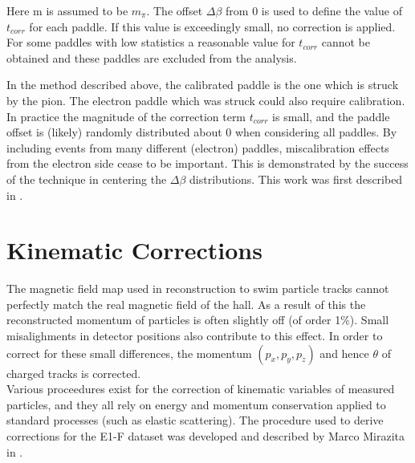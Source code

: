 Here m is assumed to be $m_{\pi}$.  The offset $\Delta \beta$ from 0 is used to define the value of $t_{corr}$ for each paddle.  If this value is exceedingly small, no correction is applied.  For some paddles with low statistics a reasonable value for $t_{corr}$ cannot be obtained and these paddles are excluded from the analysis.  \\


In the method described above, the calibrated paddle is the one which is struck by the pion.  The electron paddle which was struck could also require calibration.  In practice the magnitude of the correction term $t_{corr}$ is small, and the paddle offset is (likely) randomly distributed about 0 when considering all paddles.  By including events from many different (electron) paddles, miscalibration effects from the electron side cease to be important.  This is demonstrated by the success of the technique in centering the $\Delta \beta$ distributions.  This work was first described in \cite{theses-harrison:2015}. \\

\section{Kinematic Corrections}
The magnetic field map used in reconstruction to swim particle tracks cannot perfectly match the real magnetic field of the hall.  As a result of this the reconstructed momentum of particles is often slightly off (of order 1\%).  Small misalighments in detector positions also contribute to this effect.  In order to correct for these small differences, the momentum $(p_x, p_y, p_z)$ and hence $\theta$ of charged tracks is corrected. \\

Various proceedures exist for the correction of kinematic variables of measured particles, and they all rely on energy and momentum conservation applied to standard processes (such as elastic scattering).  The procedure used to derive corrections for the E1-F dataset was developed and described by Marco Mirazita in \cite{misc-mirazita:2010}.  \\

